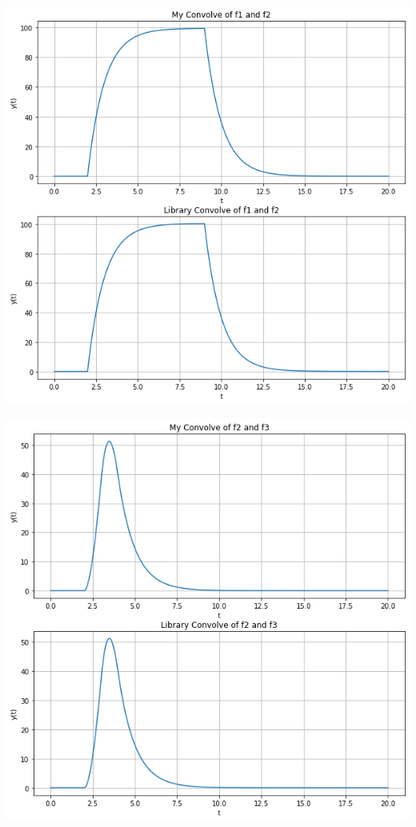 \documentclass[12pt]{report}
\begin{document}
    \includegraphics[scale=0.6]{task 2.png}

    \includegraphics[scale=0.6]{task 3.png}
\end{document}
